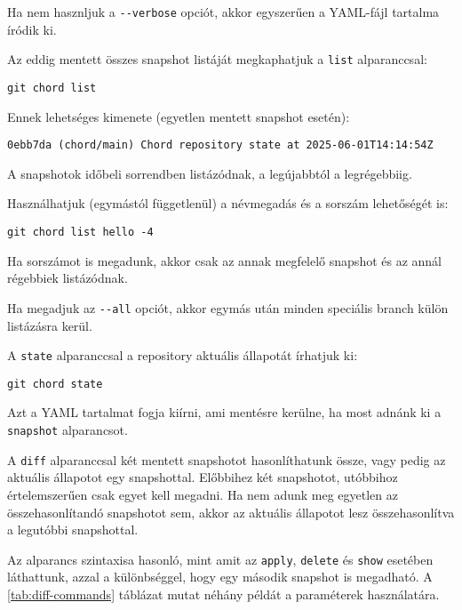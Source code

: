 \documentclass[final]{elteikthesis}[2025/03/25]
\begin{document}
Ha nem hasznljuk a \verb|--verbose| opciót, akkor egyszerűen a YAML-fájl tartalma íródik ki.

Az eddig mentett összes snapshot listáját megkaphatjuk a \verb|list| alparanccsal:

\begin{verbatim}
git chord list
\end{verbatim}

Ennek lehetséges kimenete (egyetlen mentett snapshot esetén):

\begin{verbatim}
0ebb7da (chord/main) Chord repository state at 2025-06-01T14:14:54Z
\end{verbatim}

A snapshotok időbeli sorrendben listázódnak, a legújabbtól a legrégebbiig.

Használhatjuk (egymástól függetlenül) a névmegadás és a sorszám lehetőségét is:

\begin{verbatim}
git chord list hello -4
\end{verbatim}

Ha sorszámot is megadunk, akkor csak az annak megfelelő snapshot és az annál régebbiek listázódnak.

Ha megadjuk az \verb|--all| opciót, akkor egymás után minden speciális branch külön listázásra kerül.

A \verb|state| alparanccsal a repository aktuális állapotát írhatjuk ki:

\begin{verbatim}
git chord state
\end{verbatim}

Azt a YAML tartalmat fogja kiírni, ami mentésre kerülne, ha most adnánk ki a \verb|snapshot| alparancsot.

A \verb|diff| alparanccsal két mentett snapshotot hasonlíthatunk össze,
vagy pedig az aktuális állapotot egy snapshottal.
Előbbihez két snapshotot, utóbbihoz értelemszerűen csak egyet kell megadni.
Ha nem adunk meg egyetlen az összehasonlítandó snapshotot sem,
akkor az aktuális állapotot lesz összehasonlítva a legutóbbi snapshottal.

Az alparancs szintaxisa hasonló, mint amit az \verb|apply|, \verb|delete| és \verb|show|
esetében láthattunk,
azzal a különbséggel, hogy egy második snapshot is megadható.
A \ref{tab:diff-commands} táblázat mutat néhány példát a paraméterek használatára.
\end{document}
